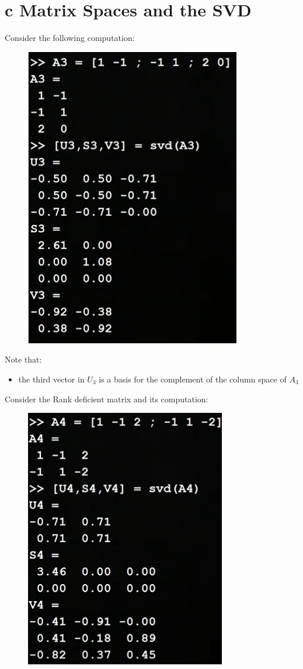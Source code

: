 \documentclass[12pt]{book}
\begin{document}
\section*{c Matrix Spaces and the SVD}
Consider the following computation:
\begin{figure}[h]
        \centering
        \includegraphics[scale = 0.4]{./figures/MatSVD}
\end{figure}

Note that:
\begin{itemize}
        \item the third vector in $U_3$ is a basis for the complement of the column space of $A_3$
\end{itemize}

Consider the Rank deficient matrix and its computation:
\begin{figure}[h]
        \centering
        \includegraphics[scale = 0.45]{./figures/MatSVD2}
\end{figure}
\end{document}
